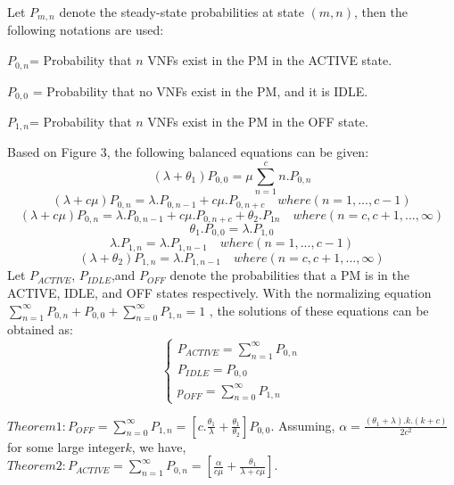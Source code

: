 \documentclass[12pt]{article}
\begin{document}
Let $P_{m,n}$
denote the steady-state probabilities at state $(m,n)$,
then the following notations are used:

$P_{0,n}$= Probability that $n$ VNFs exist in the PM in the
ACTIVE state.

$P_{0,0}$ = Probability that  no VNFs exist in the PM, and it is
IDLE.

$P_{1,n}$= Probability that $n$ VNFs exist in the PM in the OFF
state.

Based on Figure 3, the following balanced equations can be
given:
\begin{equation}
(\lambda+\theta_1)P_{0,0}=\mu\sum_{n=1}^{c}n.P_{0,n}
\end{equation}
\begin{equation}
(\lambda+c\mu)P_{0,n}=\lambda.P_{0,n-1}+c\mu.P_{0,n+c}\quad      where( n=1,...,c-1)
\end{equation}
\begin{equation}
(\lambda+c\mu)P_{0,n}=\lambda.P_{0,n-1}+c\mu.P_{0,n+c}+\theta_2.P_{1n}\quad      where( n=c,c+1,...,\infty)
\end{equation}
\begin{equation}
\theta_1.P_{0,0}=\lambda.P_{1,0}
\end{equation}
\begin{equation}
\lambda.P_{1,n}=\lambda.P_{1,n-1} \quad where (n=1,...,c-1)
\end{equation}
\begin{equation}
(\lambda+\theta_2)P_{1,n}=\lambda.P_{1,n-1} \quad where (n=c,c+1,...,\infty)
\end{equation}
Let $P_{ACTIVE}$, $P_{IDLE}$,and $P_{OFF}$ denote the probabilities that a
PM is in the ACTIVE, IDLE, and OFF states respectively.
With the normalizing equation $\sum_{n=1}^{\infty}P_{0,n}+P_{0,0}+\sum_{n=0} ^{\infty}P_{1,n}=1$
, the solutions of these equations can be obtained as:
\[ 
  \begin{cases}
    P_{ACTIVE}=\sum_{n=1}^{\infty}P_{0,n}\\
    P_{IDLE}=P_{0,0}\\
    p_{OFF}=\sum_{n=0}^{\infty}P_{1,n}
  \end{cases}
\]

$Theorem 1:P_{OFF}=\sum_{n=0}^{\infty}P_{1,n}=[c.\frac{\theta_1}{\lambda}+\frac{\theta_1}{\theta_2}]P_{0,0}$.
Assuming, $\alpha =\frac{(\theta_1+\lambda).k.(k+c)}{2c^2} $  
 for some large integer$k$, we have,\\

$Theorem 2:P_{ACTIVE}=\sum_{n=1}^{\infty}P_{0,n}=[\frac{\alpha}{c\mu}+\frac{\theta_1}{\lambda+c\mu}]$.\\
\end{document}
